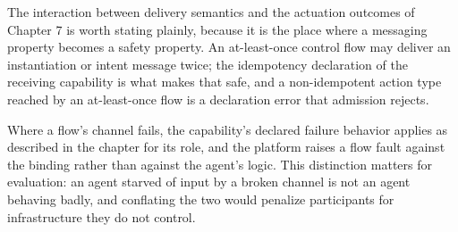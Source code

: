 The interaction between delivery semantics and the actuation outcomes of
Chapter 7 is worth stating plainly, because it is the place where a
messaging property becomes a safety property. An at-least-once control
flow may deliver an instantiation or intent message twice; the
idempotency declaration of the receiving capability is what makes that
safe, and a non-idempotent action type reached by an at-least-once flow
is a declaration error that admission rejects.

Where a flow's channel fails, the capability's declared failure behavior
applies as described in the chapter for its role, and the platform
raises a flow fault against the binding rather than against the agent's
logic. This distinction matters for evaluation: an agent starved of
input by a broken channel is not an agent behaving badly, and conflating
the two would penalize participants for infrastructure they do not
control.

